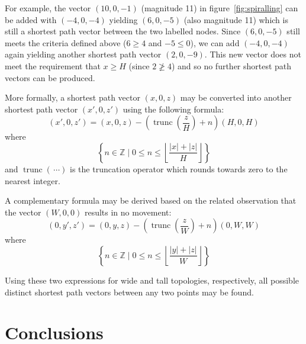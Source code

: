 			For example, the vector $(10, 0, -1)$ (magnitude 11) in
			figure~\ref{fig:spiralling} can be added with $(-4, 0, -4)$ yielding $(6,
			0, -5)$ (also magnitude 11) which is still a shortest path vector between
			the two labelled nodes.  Since $(6, 0, -5)$ still meets the criteria
			defined above ($6 \ge 4$ and $-5 \le 0$), we can add $(-4, 0, -4)$ again
			yielding another shortest path vector $(2, 0, -9)$.  This new vector does
			not meet the requirement that $x \ge H$ (since $2 \ngeq 4$) and so no
			further shortest path vectors can be produced.
			
			More formally, a shortest path vector $(x, 0, z)$ may be converted into
			another shortest path vector $(x', 0, z')$ using the following formula:
			\begin{equation*}
				(x', 0, z') = (x, 0, z) - \left(\operatorname{trunc}\left(\frac{z}{H}\right) + n\right)(H, 0, H)
			\end{equation*}
			where
			\begin{equation*}
				\left\{
					n \in \mathbb{Z}
				\;\Big|\;
					0 \le n \le
						\left\lfloor
							\frac{\left|x\right| + \left|z\right|}{H}
						\right\rfloor
				\right\}
			\end{equation*}
			and $\operatorname{trunc}(\,\cdots)$ is the truncation operator which
			rounds towards zero to the nearest integer.
			
			A complementary formula may be derived based on the related observation
			that the vector $(W, 0, 0)$ results in no movement:
			\begin{equation*}
				(0, y', z') = (0, y, z) - \left(\operatorname{trunc}\left(\frac{z}{W}\right) + n\right)(0, W, W)
			\end{equation*}
			where
			\begin{equation*}
				\left\{
					n \in \mathbb{Z}
				\;\Big|\;
					0 \le n \le
						\left\lfloor
							\frac{\left|y\right| + \left|z\right|}{W}
						\right\rfloor
				\right\}
			\end{equation*}
			
			Using these two expressions for wide and tall topologies, respectively,
			all possible distinct shortest path vectors between any two points may be
			found.
	
	\section{Conclusions}
		
